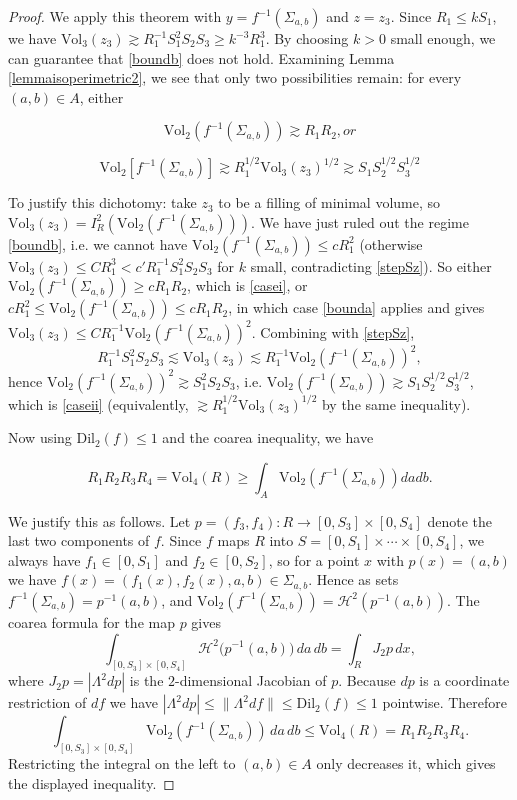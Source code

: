 \documentclass{amsart}
\newtheorem*{theorem 1}{Theorem 1}
\newtheorem*{theorem 2}{Theorem 2}
\newtheorem*{theorem 3}{Theorem 3}
\numberwithin{equation}{section}
\newcommand{\Dil}{\textrm{Dil}}
\newcommand{\Vol}{\textrm{Vol}}
\begin{document}
\begin{proof}
We apply this theorem with $y = f^{-1}(\Sigma_{a,b})$ and $z = z_3$.   Since $R_1 \le k S_1$,  we have $\Vol_3(z_3) \gtrsim R_1^{-1} S_1^2 S_2 S_3 \ge k^{-3} R_1^3$.   By choosing $k > 0$ small enough,  we can guarantee that \eqref{boundb} does not hold.   Examining Lemma \ref{lemmaisoperimetric2},  we see that only two possibilities remain: for every $(a,b) \in A$,  either

\begin{equation} \label{casei} \Vol_2(f^{-1}(\Sigma_{a,b})) \gtrsim R_1 R_2,  or \end{equation}

\begin{equation} \label{caseii} \Vol_2[f^{-1}(\Sigma_{a,b})] \gtrsim R_1^{1/2} \Vol_3(z_3)^{1/2} \gtrsim S_1 S_2^{1/2} S_3^{1/2} \end{equation}

To justify this dichotomy: take $z_3$ to be a filling of minimal
volume, so $\Vol_3(z_3) = I_R^2(\Vol_2(f^{-1}(\Sigma_{a,b})))$.
We have just ruled out the regime \eqref{boundb}, i.e. we cannot
have $\Vol_2(f^{-1}(\Sigma_{a,b})) \le c R_1^2$ (otherwise
$\Vol_3(z_3) \le C R_1^3 < c' R_1^{-1} S_1^2 S_2 S_3$ for $k$ small,
contradicting \eqref{stepSz}).  So either
$\Vol_2(f^{-1}(\Sigma_{a,b})) \ge c R_1 R_2$, which is
\eqref{casei}, or $c R_1^2 \le \Vol_2(f^{-1}(\Sigma_{a,b})) \le c
R_1 R_2$, in which case \eqref{bounda} applies and gives
$\Vol_3(z_3) \le C R_1^{-1}\Vol_2(f^{-1}(\Sigma_{a,b}))^2$.
Combining with \eqref{stepSz},
$$ R_1^{-1} S_1^2 S_2 S_3 \lesssim \Vol_3(z_3) \lesssim R_1^{-1}
   \Vol_2(f^{-1}(\Sigma_{a,b}))^2, $$
hence $\Vol_2(f^{-1}(\Sigma_{a,b}))^2 \gtrsim S_1^2 S_2 S_3$, i.e.
$\Vol_2(f^{-1}(\Sigma_{a,b})) \gtrsim S_1 S_2^{1/2} S_3^{1/2}$,
which is \eqref{caseii} (equivalently, $\gtrsim R_1^{1/2}
\Vol_3(z_3)^{1/2}$ by the same inequality).

Now using $\Dil_2(f) \le 1$ and the coarea inequality,  we have

$$ R_1 R_2 R_3 R_4 = \Vol_4 (R) \ge \int_{A} \Vol_2(f^{-1}(\Sigma_{a,b})) da db. $$

We justify this as follows.  Let $p = (f_3, f_4): R \to [0,S_3]
\times [0, S_4]$ denote the last two components of $f$.  Since $f$
maps $R$ into $S = [0,S_1]\times\cdots\times[0,S_4]$, we always have
$f_1 \in [0,S_1]$ and $f_2 \in [0,S_2]$, so for a point $x$ with
$p(x) = (a,b)$ we have $f(x) = (f_1(x),f_2(x),a,b) \in
\Sigma_{a,b}$.  Hence as sets $f^{-1}(\Sigma_{a,b}) = p^{-1}(a,b)$,
and $\Vol_2(f^{-1}(\Sigma_{a,b})) = \mathcal H^2(p^{-1}(a,b))$.
The coarea formula for the map $p$ gives
$$ \int_{[0,S_3]\times[0,S_4]} \mathcal H^2\big(p^{-1}(a,b)\big)\,da\,db
   = \int_R J_2 p \, dx, $$
where $J_2 p = |\Lambda^2 dp|$ is the $2$-dimensional Jacobian of
$p$.  Because $dp$ is a coordinate restriction of $df$ we have
$|\Lambda^2 dp| \le \|\Lambda^2 df\| \le \Dil_2(f) \le 1$
pointwise.  Therefore
$$ \int_{[0,S_3]\times[0,S_4]} \Vol_2(f^{-1}(\Sigma_{a,b}))\,da\,db
   \le \Vol_4(R) = R_1 R_2 R_3 R_4. $$
Restricting the integral on the left to $(a,b)\in A$ only decreases
it, which gives the displayed inequality.


\end{proof}
\end{document}
